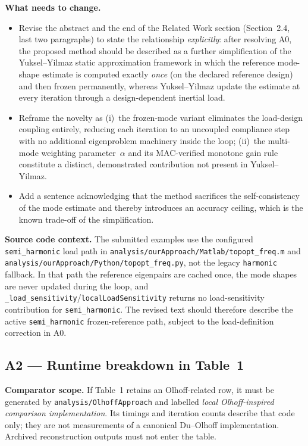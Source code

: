 \documentclass[12pt,a4paper]{article}
\begin{document}
\textbf{What needs to change.}
\begin{itemize}[leftmargin=1.6em]
  \item Revise the abstract and the end of the Related Work section
        (Section~2.4, last two paragraphs) to state the relationship
        \emph{explicitly}: after resolving A0, the proposed method should be
        described as a further simplification of the Yuksel--Yilmaz static
        approximation framework in which the reference mode-shape estimate is
        computed exactly \emph{once} (on the declared reference design) and
        then frozen permanently, whereas Yuksel--Yilmaz update the estimate at
        every iteration through a design-dependent inertial load.
  \item Reframe the novelty as (i)~the frozen-mode variant eliminates the
        load-design coupling entirely, reducing each iteration to an uncoupled
        compliance step with no additional eigenproblem machinery inside the
        loop; (ii)~the multi-mode weighting parameter~$\alpha$ and its
        MAC-verified monotone gain rule constitute a distinct, demonstrated
        contribution not present in Yuksel--Yilmaz.
  \item Add a sentence acknowledging that the method sacrifices the
        self-consistency of the mode estimate and thereby introduces an
        accuracy ceiling, which is the known trade-off of the simplification.
\end{itemize}

\textbf{Source code context.}  The submitted examples use the configured
\texttt{semi\_harmonic} load path in
\texttt{analysis/ourApproach/Matlab/topopt\_freq.m} and
\texttt{analysis/ourApproach/Python/topopt\_freq.py}, not the legacy
\texttt{harmonic} fallback.  In that path the reference eigenpairs are cached
once, the mode shapes are never updated during the loop, and
\texttt{\_load\_sensitivity}/\texttt{localLoadSensitivity} returns no
load-sensitivity contribution for \texttt{semi\_harmonic}.  The revised text
should therefore describe the active \texttt{semi\_harmonic}
frozen-reference path, subject to the load-definition correction in A0.

\subsection{A2 — Runtime breakdown in Table~1}

\textbf{Comparator scope.}  If Table~1 retains an Olhoff-related row, it
must be generated by \texttt{analysis/OlhoffApproach} and labelled
\emph{local Olhoff-inspired comparison implementation}.  Its timings and
iteration counts describe that code only; they are not measurements of a
canonical Du--Olhoff implementation.  Archived reconstruction outputs must
not enter the table.
\end{document}
